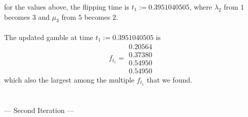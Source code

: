 \documentclass{article}
\begin{document}
for the values above, the flipping time is $t_{1}:= 0.3951040505$, where $\lambda_{2}$ from $1$ becomes $3$ and $\mu_{3}$ from $5$ becomes $2$.\\\\
The updated gamble at time $t_{1}:= 0.3951040505$ is
\begin{equation*} 
 f_{t_1}= 
 \begin{array}{|c|}
  0.20564\\
  0.37380\\
  0.54950\\
  0.54950  
 \end{array}
 \end{equation*}
 which also the largest among the multiple $f_{t_1}$ that we found.\\\\\\


--- Second Iteration ---
\end{document}
